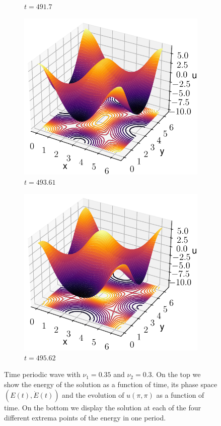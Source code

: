 \documentclass[twoside]{article}
\begin{document}
\begin{figure}
\begin{subfigure}[ht]{0.24\textwidth}
    \caption{$t=491.7$}
  \end{subfigure}\hfill
  \begin{subfigure}[ht]{0.24\textwidth}
    \includegraphics[width=\textwidth]{images/slice_nu1_0.35_nu2_0.3_time_493.61.pdf}
    \caption{$t=493.61$}
  \end{subfigure}\hfill
  \begin{subfigure}[ht]{0.24\textwidth}
    \includegraphics[width=\textwidth]{images/slice_nu1_0.35_nu2_0.3_time_495.62.pdf}
    \caption{$t=495.62$}
  \end{subfigure}
  \caption{Time periodic wave with $\nu_1=0.35$ and $\nu_2=0.3$. On the top we show the energy of the solution as a function of time, its phase space $(E(t), \dot{E}(t))$ and the evolution of $u(\pi,\pi)$ as a function of time. On the bottom we display the solution at each of the four different extrema points of the energy in one period.}
\end{figure}
\end{document}
